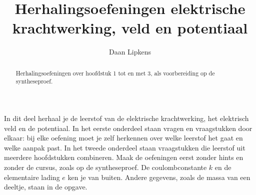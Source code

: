 \documentclass{ximera}
\title{Herhalingsoefeningen elektrische krachtwerking, veld en potentiaal}
\author{Daan Lipkens}
\begin{document}
\begin{abstract}
    Herhalingsoefeningen over hoofdstuk 1 tot en met 3, als voorbereiding op de syntheseproef.
\end{abstract}
\maketitle

In dit deel herhaal je de leerstof van de elektrische krachtwerking, het elektrisch veld en de potentiaal. In het eerste onderdeel staan vragen en vraagstukken door elkaar: bij elke oefening moet je zelf herkennen over welke leerstof het gaat en welke aanpak past. In het tweede onderdeel staan vraagstukken die leerstof uit meerdere hoofdstukken combineren. Maak de oefeningen eerst zonder hints en zonder de cursus, zoals op de syntheseproef. De coulombconstante $k$ en de elementaire lading $e$ ken je van buiten. Andere gegevens, zoals de massa van een deeltje, staan in de opgave.
\end{document}
